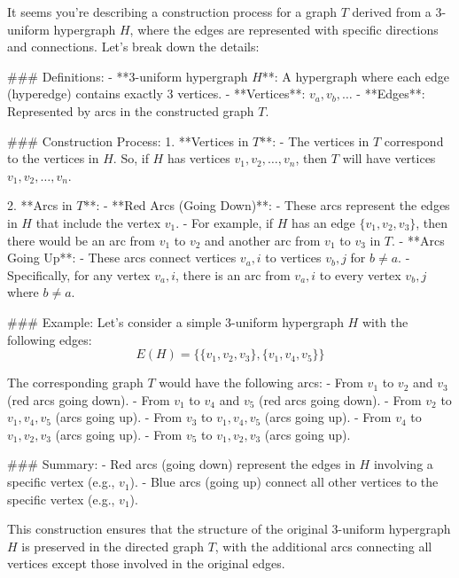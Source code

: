 It seems you're describing a construction process for a graph \( T \) derived from a 3-uniform hypergraph \( H \), where the edges are represented with specific directions and connections. Let's break down the details:

### Definitions:
- **3-uniform hypergraph \( H \)**: A hypergraph where each edge (hyperedge) contains exactly 3 vertices.
- **Vertices**: \( v_a, v_b, \ldots \)
- **Edges**: Represented by arcs in the constructed graph \( T \).

### Construction Process:
1. **Vertices in \( T \)**:
   - The vertices in \( T \) correspond to the vertices in \( H \). So, if \( H \) has vertices \( v_1, v_2, \ldots, v_n \), then \( T \) will have vertices \( v_1, v_2, \ldots, v_n \).

2. **Arcs in \( T \)**:
   - **Red Arcs (Going Down)**:
     - These arcs represent the edges in \( H \) that include the vertex \( v_1 \).
     - For example, if \( H \) has an edge \( \{v_1, v_2, v_3\} \), then there would be an arc from \( v_1 \) to \( v_2 \) and another arc from \( v_1 \) to \( v_3 \) in \( T \).
   - **Arcs Going Up**:
     - These arcs connect vertices \( v_a, i \) to vertices \( v_b, j \) for \( b \neq a \).
     - Specifically, for any vertex \( v_a, i \), there is an arc from \( v_a, i \) to every vertex \( v_b, j \) where \( b \neq a \).

### Example:
Let's consider a simple 3-uniform hypergraph \( H \) with the following edges:
\[ E(H) = \{\{v_1, v_2, v_3\}, \{v_1, v_4, v_5\}\} \]

The corresponding graph \( T \) would have the following arcs:
- From \( v_1 \) to \( v_2 \) and \( v_3 \) (red arcs going down).
- From \( v_1 \) to \( v_4 \) and \( v_5 \) (red arcs going down).
- From \( v_2 \) to \( v_1, v_4, v_5 \) (arcs going up).
- From \( v_3 \) to \( v_1, v_4, v_5 \) (arcs going up).
- From \( v_4 \) to \( v_1, v_2, v_3 \) (arcs going up).
- From \( v_5 \) to \( v_1, v_2, v_3 \) (arcs going up).

### Summary:
- Red arcs (going down) represent the edges in \( H \) involving a specific vertex (e.g., \( v_1 \)).
- Blue arcs (going up) connect all other vertices to the specific vertex (e.g., \( v_1 \)).

This construction ensures that the structure of the original 3-uniform hypergraph \( H \) is preserved in the directed graph \( T \), with the additional arcs connecting all vertices except those involved in the original edges.